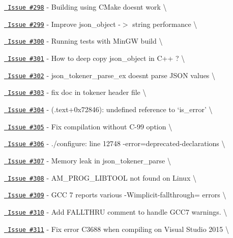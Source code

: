 \begin{DoxyItemize}
\item \href{https://github.com/json-c/json-c/issues/298}{\texttt{ Issue \#298}} -\/ Building using CMake doesn\textquotesingle{}t work \textbackslash{}
\item \href{https://github.com/json-c/json-c/issues/299}{\texttt{ Issue \#299}} -\/ Improve json\+\_\+object -\/$>$ string performance \textbackslash{}
\item \href{https://github.com/json-c/json-c/issues/300}{\texttt{ Issue \#300}} -\/ Running tests with Min\+GW build \textbackslash{}
\item \href{https://github.com/json-c/json-c/issues/301}{\texttt{ Issue \#301}} -\/ How to deep copy json\+\_\+object in C++ ? \textbackslash{}
\item \href{https://github.com/json-c/json-c/issues/302}{\texttt{ Issue \#302}} -\/ json\+\_\+tokener\+\_\+parse\+\_\+ex doesn\textquotesingle{}t parse JSON values \textbackslash{}
\item \href{https://github.com/json-c/json-c/issues/303}{\texttt{ Issue \#303}} -\/ fix doc in tokener header file \textbackslash{}
\item \href{https://github.com/json-c/json-c/issues/304}{\texttt{ Issue \#304}} -\/ (.text+0x72846)\+: undefined reference to `is\+\_\+error' \textbackslash{}
\item \href{https://github.com/json-c/json-c/issues/305}{\texttt{ Issue \#305}} -\/ Fix compilation without C-\/99 option \textbackslash{}
\item \href{https://github.com/json-c/json-c/issues/306}{\texttt{ Issue \#306}} -\/ ./configure\+: line 12748 -\/error=deprecated-\/declarations \textbackslash{}
\item \href{https://github.com/json-c/json-c/issues/307}{\texttt{ Issue \#307}} -\/ Memory leak in json\+\_\+tokener\+\_\+parse \textbackslash{}
\item \href{https://github.com/json-c/json-c/issues/308}{\texttt{ Issue \#308}} -\/ AM\+\_\+\+PROG\+\_\+\+LIBTOOL not found on Linux \textbackslash{}
\item \href{https://github.com/json-c/json-c/issues/309}{\texttt{ Issue \#309}} -\/ GCC 7 reports various -\/Wimplicit-\/fallthrough= errors \textbackslash{}
\item \href{https://github.com/json-c/json-c/issues/310}{\texttt{ Issue \#310}} -\/ Add FALLTHRU comment to handle GCC7 warnings. \textbackslash{}
\item \href{https://github.com/json-c/json-c/issues/311}{\texttt{ Issue \#311}} -\/ Fix error C3688 when compiling on Visual Studio 2015 \textbackslash{}

\end{DoxyItemize}
